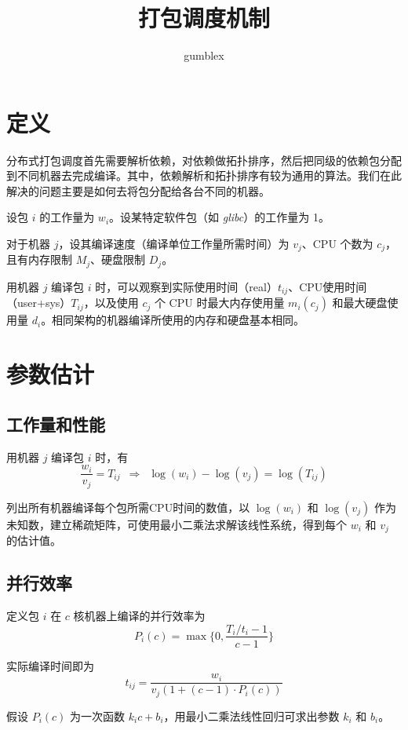 \documentclass[UTF8,zihao=-4]{ctexart}
\title{打包调度机制}
\date{}
\author{gumblex}
\begin{document}
\maketitle

\section{定义}
分布式打包调度首先需要解析依赖，对依赖做拓扑排序，然后把同级的依赖包分配到不同机器去完成编译。其中，依赖解析和拓扑排序有较为通用的算法。我们在此解决的问题主要是如何去将包分配给各台不同的机器。

设包 $i$ 的工作量为 $w_i$。设某特定软件包（如 \textit{glibc}）的工作量为 1。

对于机器 $j$，设其编译速度（编译单位工作量所需时间）为 $v_j$、CPU 个数为 $c_j$，且有内存限制 $M_j$、硬盘限制 $D_j$。

用机器 $j$ 编译包 $i$ 时，可以观察到实际使用时间（real）$t_{ij}$、CPU使用时间（user+sys）$T_{ij}$，以及使用 $c_j$ 个 CPU 时最大内存使用量 $m_i(c_j)$ 和最大硬盘使用量 $d_i$。相同架构的机器编译所使用的内存和硬盘基本相同。

\section{参数估计}

\subsection{工作量和性能}

用机器 $j$ 编译包 $i$ 时，有
$$ \frac{w_i}{v_j} = T_{ij} \enspace \Rightarrow \enspace
\log(w_i) - \log(v_j) = \log(T_{ij})$$

列出所有机器编译每个包所需CPU时间的数值，以 $\log(w_i)$ 和 $\log(v_j)$ 作为未知数，建立稀疏矩阵，可使用最小二乘法求解该线性系统，得到每个 $w_i$ 和 $v_j$ 的估计值。

\subsection{并行效率}

定义包 $i$ 在 $c$ 核机器上编译的并行效率为 $$ P_i(c) = \max \{0, \frac{T_i/t_i-1}{c-1} \} $$

实际编译时间即为
\begin{equation}
\label{eq_ti} t_{ij} = \frac{w_i}{v_j (1 + (c-1) \cdot P_i(c))}
\end{equation}

假设 $ P_i(c) $ 为一次函数 $ k_i c + b_i $，用最小二乘法线性回归可求出参数 $k_i$ 和 $b_i$。
\end{document}
